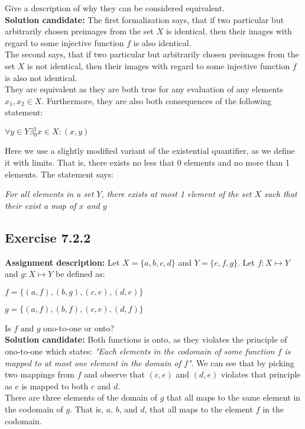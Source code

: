 \documentclass{report}
\newcommand{\cent}[1]{\begin{center}#1\end{center}}
\newcommand{\In}{\! \in \!}
\newcommand{\assignmentDescription}{\textbf{Assignment description: }}
\newcommand{\solution}{\textbf{Solution candidate: }}
\newcommand{\Exercise}[1]{\subsection{Exercise #1}}
\begin{document}
 	Give a description of why they can be considered equivalent.\\
 	
 	\solution
 	The first formalization says, that if two particular but arbitrarily chosen preimages from the set $X$ is identical, then their images with regard to some injective function $f$ is also identical.\\
 	
 	The second says, that if two particular but arbitrarily chosen preimages from the set $X$ is not identical, then their images with regard to some injective function $f$ is also not identical.\\
 	
 	They are equivalent as they are both true for any evaluation of any elements $x_1,x_2 \In X$. Furthermore, they are also both consequences of the following statement:
 	
 	\cent{$\forall y \In Y \exists_0^1 x \In X : (x,y)$} 	
 	 
 	 Here we use a slightly modified variant of the existential quantifier, as we define it with limits. That is, there exists no less that 0 elements and no more than 1 elements. The statement says:
 	 
 	 \begin{center}
 	 	\textit{For all elements in a set $Y$, there exists at most 1 element of the set $X$ such that their exist a map of  $x$  and $y$}
 	 \end{center}
 	
 	\Exercise{7.2.2}
 	
 	\assignmentDescription
 	Let $X = \{a,b,c,d\}$ and $Y = \{e,f,g\}$. Let $f : X \mapsto Y$ and $g : X \mapsto Y$ be defined as:
 	
 	\cent{$f = \{(a,f),(b,g),(c,e), (d,e)\}$}
 	\cent{$g = \{(a,f),(b,f),(c,e), (d,f)\}$}
 	
 	Is $f$ and $g$ ono-to-one or onto?\\
 	
 	\solution
 	Both functions is onto, as they violates the principle of ono-to-one which states: \textit{"Each elements in the codomain of some function $f$ is mapped to at most one element in the domain of $f$"}. We can see that by picking two mappings from $f$ and observe that $(c,e)$ and $(d,e)$ violates that principle as $e$ is mapped to both $c$ and $d$.\\
 	
 	There are three elements of the domain of $g$ that all maps to the same element in the codomain of $g$. That is, $a$, $b$, and $d$, that all maps to the element $f$ in the codomain.
 	
\end{document}
